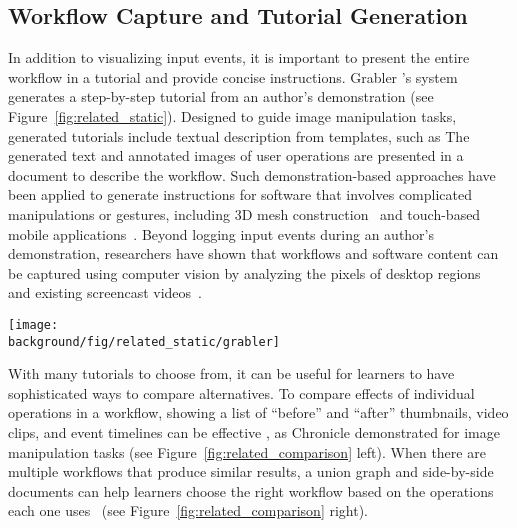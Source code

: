 
\subsection{Workflow Capture and Tutorial Generation}
In addition to visualizing input events, it is important to present the entire workflow in a tutorial and provide concise instructions.
%
Grabler \ea{}'s system~\cite{Grabler:2009jj} generates a step-by-step tutorial from an author's demonstration (see Figure~\ref{fig:related_static}). Designed to guide image manipulation tasks, generated tutorials include textual description from templates, such as  The generated text and annotated images of user operations are presented in a document to describe the workflow.
%
Such demonstration-based approaches have been applied to generate instructions for software that involves complicated manipulations or gestures, including 3D mesh construction~\cite{Denning:2011fy} and touch-based mobile applications~\cite{Wang:2014:EAC:2556288.2557407}.
%
Beyond logging input events during an author's demonstration, researchers have shown that workflows and software content can be captured using computer vision by analyzing the pixels of desktop regions~\cite{Yeh:2009dh,Chang:2011vd} and existing screencast videos~\cite{Banovic:2012kd}.

\begin{figure*}[t!]
  \centering
  \texttt{[image: \\background/fig/related\_static/grabler]}
  \caption{A static tutorial automatically generated by Grabler \ea{}'s system~\cite{Grabler:2009jj}.}
  \label{fig:related_static}
\end{figure*}

With many tutorials to choose from, it can be useful for learners to have sophisticated ways to compare alternatives. To compare effects of individual operations in a workflow, showing a list of ``before'' and ``after'' thumbnails, video clips, and event timelines can be effective \cite{Grossman:2010jz}, as Chronicle demonstrated for image manipulation tasks (see Figure~\ref{fig:related_comparison} left).
%
When there are multiple workflows that produce similar results, a union graph and side-by-side documents can help learners choose the right workflow based on the operations each one uses~\cite{Kong:2012:DTR:2207676.2208549} (see Figure~\ref{fig:related_comparison} right).

